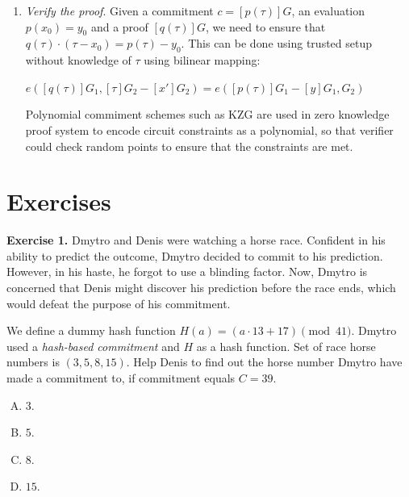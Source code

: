 \documentclass[../lecture-notes.tex]{subfiles}
\begin{document}
\begin{enumerate}
    The existance of this quotient polynomial serves
    as a proof of the evaluation. \textit{Prover} calculates proof $\pi = [q(\tau)]G$ and sends it to the \textit{Verifier}.

    \item \textit{Verify the proof}. Given a commitment $c = [p(\tau)]G$, an evaluation $p(x_0) = y_0$ and a proof $[q(\tau)]G$, we need to
    ensure that $q(\tau) \cdot (\tau - x_0) = p(\tau) - y_0$. This can be done using trusted setup without knowledge of $\tau$ using bilinear mapping:

    \begin{center}
        $e([q(\tau)]G_1, [\tau]G_2 - [x']G_2) = e([p(\tau)]G_1 - [y]G_1, G_2)$
    \end{center}
    
    Polynomial commiment schemes such as KZG are used in zero knowledge proof system to encode circuit constraints as a polynomial, 
    so that verifier could check random points to ensure that the constraints are met.

\end{enumerate}

\section{Exercises}

\textbf{Exercise 1.} Dmytro and Denis were watching a horse race. 
    Confident in his ability to predict the outcome, Dmytro decided to commit to his prediction. 
    However, in his haste, he forgot to use a blinding factor. 
    Now, Dmytro is concerned that Denis might discover his prediction before the race ends, 
    which would defeat the purpose of his commitment.
    
    We define a dummy hash function $H(a) = (a \cdot 13 + 17) \pmod{41}$.
    Dmytro used a \textit{hash-based commitment} and $H$ as a hash function. 
    Set of race horse numbers is $(3, 5, 8, 15)$.
    Help Denis to find out the horse number Dmytro have made a commitment to, 
    if commitment equals $C = 39$.

\begin{enumerate}[(A)]
    \item $3$.
    \item $5$.
    \item $8$.
    \item $15$.
\end{enumerate}
\end{document}
